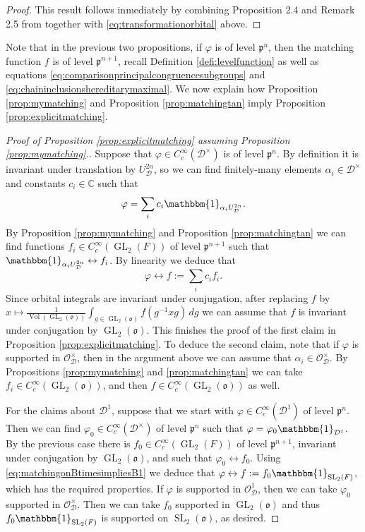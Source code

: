 \documentclass{article}
\theoremstyle{named}
\newcommand{\D}{\mathcal{D}}
\newcommand{\CC}{\mathbb{C}}
\renewcommand{\O}{\mathcal{O}}
\renewcommand{\o}{\mathfrak{o}}
\newcommand{\p}{\mathfrak{p}}
\DeclareMathOperator{\SL}{SL}
\DeclareMathOperator{\GL}{GL}
\DeclareMathOperator{\vol}{Vol}
\begin{document}
\begin{proof}
This result follows inmediately by combining Proposition 2.4 and Remark 2.5 from \cite{tang2025} together with \eqref{eq:transformationorbital} above.
\end{proof}

Note that in the previous two propositions, if $\varphi$ is of level $\p^n$, then the matching function $f$ is of level $\p^{n + 1}$, recall Definition \ref{defi:levelfunction} as well as equations \eqref{eq:comparisonprincipalcongruencesubgroups} and \eqref{eq:chaininclusionshereditarymaximal}. We now explain how Proposition \ref{prop:mymatching} and Proposition \ref{prop:matchingtan} imply Proposition \ref{prop:explicitmatching}.

\begin{proof}[Proof of Proposition \ref{prop:explicitmatching} assuming Proposition \ref{prop:mymatching}.]
Suppose that $\varphi \in C_c^\infty(\D^\times)$ is of level $\p^n$. By definition it is invariant under translation by $U_\D^{2n}$, so we can find finitely-many elements $\alpha_i \in \D^\times$ and constants $c_i \in \CC$ such that  
\begin{equation*}
    \varphi = \sum_{i} c_i \mathbbm{1}_{\alpha_i U_\D^{2n}}.
\end{equation*}
By Proposition \ref{prop:mymatching} and Proposition \ref{prop:matchingtan} we can find functions $f_i \in C_c^\infty(\GL_2(F))$ of level $\p^{n + 1}$ such that $\mathbbm{1}_{\alpha_i U_\D^{2n}} \leftrightarrow f_i$. By linearity we deduce that 
\begin{equation*}
    \varphi \leftrightarrow f:= \sum_i c_i f_i.
\end{equation*}
Since orbital integrals are invariant under conjugation, after replacing $f$ by $x \mapsto \frac{1}{\vol(\GL_2(\o))}\int_{g \in \GL_2(\o)}f(g^{-1}xg) \, dg$ we can assume that $f$ is invariant under conjugation by $\GL_2(\o)$. This finishes the proof of the first claim in Proposition \ref{prop:explicitmatching}. To deduce the second claim, note that if $\varphi$ is supported in $\O_\D^\times$, then in the argument above we can assume that $\alpha_i \in \O_\D^\times$. By Propositions \ref{prop:mymatching} and \ref{prop:matchingtan} we can take $f_i \in C_c^\infty(\GL_2(\o))$, and then $f \in C_c^\infty(\GL_2(\o))$ as well.

For the claims about $\D^1$, suppose that we start with $\varphi \in C_c^\infty(\D^1)$ of level $\p^{n}$. Then we can find $\varphi_0 \in C_c^\infty(\D^\times)$ of level $\p^{n}$ such that $\varphi = \varphi_0 \mathbbm{1}_{\D^1}$. By the previous case there is $f_0 \in C_c^\infty(\GL_2(F))$ of level $\p^{n + 1}$, invariant under conjugation by $\GL_2(\o)$, and such that $\varphi_0 \leftrightarrow f_0$. Using \eqref{eq:matchingonBtimesimpliesB1} we deduce that $\varphi \leftrightarrow f:= f_0 \mathbbm{1}_{\SL_2(F)}$, which has the required properties. If $\varphi$ is supported in $\O_\D^1$, then we can take $\varphi_0$ supported in $\O_\D^\times$. Then we can take $f_0$ supported in $\GL_2(\o)$ and thus $f_0 \mathbbm{1}_{\SL_2(F)}$ is supported on $\SL_2(\o)$, as desired.
\end{proof}
\end{document}
